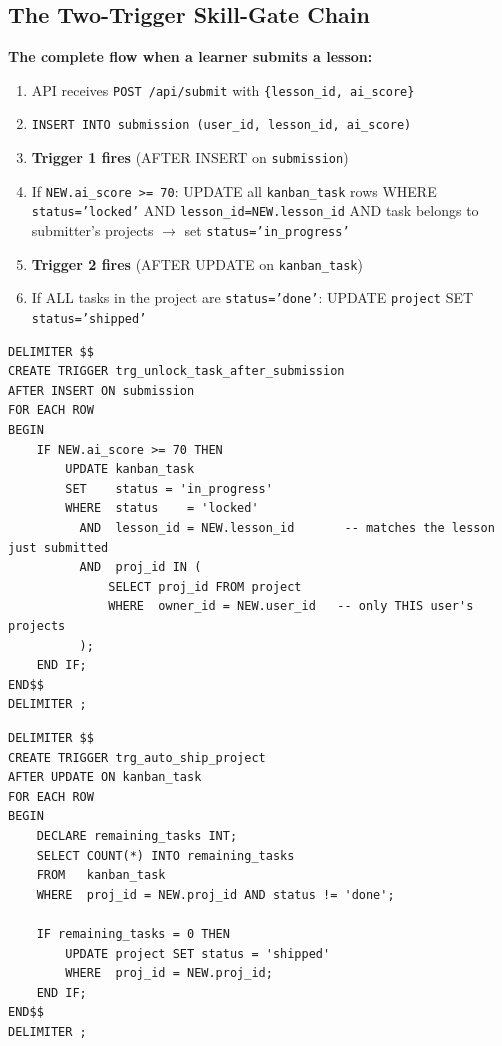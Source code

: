 \documentclass[11pt,a4paper]{article}
\newcommand{\T}[1]{\texttt{#1}}          %
\begin{document}
\subsection{The Two-Trigger Skill-Gate Chain}

\textbf{The complete flow when a learner submits a lesson:}

\begin{enumerate}[nosep, leftmargin=2em]
  \item API receives \T{POST /api/submit} with \T{\{lesson\_id, ai\_score\}}
  \item \T{INSERT INTO submission (user\_id, lesson\_id, ai\_score)}
  \item \textbf{Trigger 1 fires} (AFTER INSERT on \T{submission})
  \item If \T{NEW.ai\_score >= 70}: UPDATE all \T{kanban\_task} rows WHERE \T{status='locked'} AND \T{lesson\_id=NEW.lesson\_id} AND task belongs to submitter's projects $\to$ set \T{status='in\_progress'}
  \item \textbf{Trigger 2 fires} (AFTER UPDATE on \T{kanban\_task})
  \item If ALL tasks in the project are \T{status='done'}: UPDATE \T{project} SET \T{status='shipped'}
\end{enumerate}

\begin{lstlisting}[style=sql, caption={Trigger 1: unlock tasks on qualifying score}]
DELIMITER $$
CREATE TRIGGER trg_unlock_task_after_submission
AFTER INSERT ON submission
FOR EACH ROW
BEGIN
    IF NEW.ai_score >= 70 THEN
        UPDATE kanban_task
        SET    status = 'in_progress'
        WHERE  status    = 'locked'
          AND  lesson_id = NEW.lesson_id       -- matches the lesson just submitted
          AND  proj_id IN (
              SELECT proj_id FROM project
              WHERE  owner_id = NEW.user_id   -- only THIS user's projects
          );
    END IF;
END$$
DELIMITER ;
\end{lstlisting}

\begin{lstlisting}[style=sql, caption={Trigger 2: auto-ship project when all tasks done}]
DELIMITER $$
CREATE TRIGGER trg_auto_ship_project
AFTER UPDATE ON kanban_task
FOR EACH ROW
BEGIN
    DECLARE remaining_tasks INT;
    SELECT COUNT(*) INTO remaining_tasks
    FROM   kanban_task
    WHERE  proj_id = NEW.proj_id AND status != 'done';

    IF remaining_tasks = 0 THEN
        UPDATE project SET status = 'shipped'
        WHERE  proj_id = NEW.proj_id;
    END IF;
END$$
DELIMITER ;
\end{lstlisting}
\end{document}
